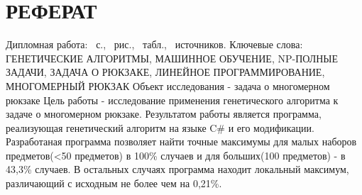 \pagestyle{plain}
\chapter*{РЕФЕРАТ}
\thispagestyle{empty}   %
Дипломная работа: \pageref*{LastPage}~с., \totfig~рис., \tottab~табл., \totref~источников.
Ключевые слова: ГЕНЕТИЧЕСКИЕ АЛГОРИТМЫ, МАШИННОЕ ОБУЧЕНИЕ, NP-ПОЛНЫЕ ЗАДАЧИ, ЗАДАЧА О РЮКЗАКЕ, ЛИНЕЙНОЕ ПРОГРАММИРОВАНИЕ, МНОГОМЕРНЫЙ РЮКЗАК
Объект исследования - задача о многомерном рюкзаке
Цель работы - исследование применения генетического алгоритма к задаче о многомерном рюкзаке.
Результатом работы является программа, реализующая генетический алгоритм на языке C\# и его модификации.
Разработаная программа позволяет найти точные максимумы для малых наборов предметов(<50 предметов) в 100\% случаев и для больших(100 предметов) - в 43,3\% случаев. В остальных случаях программа находит локальный максимум, различающий с исходным не более чем на 0,21\%.

\cleardoublepage               %
